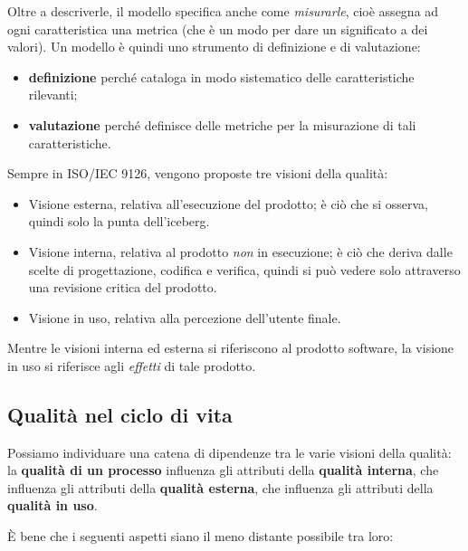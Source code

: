 \documentclass[a4paper]{article}
\begin{document}
		
Oltre a descriverle, il modello specifica anche come \emph{misurarle}, cioè assegna ad ogni caratteristica una metrica (che è un modo per dare un significato a dei valori). Un modello è quindi uno strumento di definizione e di valutazione:
		
	\begin{itemize}
		
			
	\item \textbf{definizione} perché cataloga in modo sistematico delle caratteristiche rilevanti;
			
	\item \textbf{valutazione} perché definisce delle metriche per la misurazione di tali caratteristiche.
		
	\end{itemize}

		
Sempre in ISO/IEC 9126, vengono proposte tre visioni della qualità:
		
	\begin{itemize}
		
			
	\item Visione esterna, relativa all'esecuzione del prodotto; è ciò che si osserva, quindi solo la punta dell'iceberg.
			
	\item Visione interna, relativa al prodotto \emph{non} in esecuzione; è ciò che deriva dalle scelte di progettazione, codifica e verifica, quindi si può vedere solo attraverso una revisione critica del prodotto.
			
	\item Visione in uso, relativa alla percezione dell'utente finale.
		
	\end{itemize}

		
Mentre le visioni interna ed esterna si riferiscono al prodotto software, la visione in uso si riferisce agli \emph{effetti} di tale prodotto.

		
	\subsection{Qualità nel ciclo di vita}

		
Possiamo individuare una catena di dipendenze tra le varie visioni della qualità: la \textbf{qualità di un processo} influenza gli attributi della \textbf{qualità interna}, che influenza gli attributi della \textbf{qualità esterna}, che influenza gli attributi della \textbf{qualità in uso}.
		
È bene che i seguenti aspetti siano il meno distante possibile tra loro:
		
\end{document}

